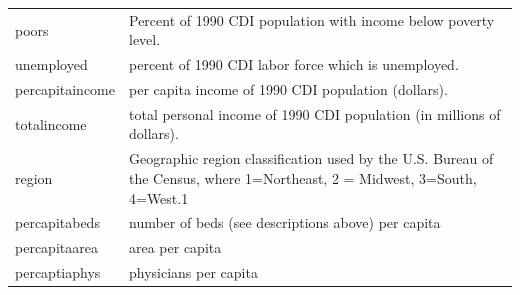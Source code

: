\documentclass[]{article}
\begin{document}
\begin{longtable}[]{@{}ll@{}}
\begin{minipage}[t]{0.11\columnwidth}
poors\strut
\end{minipage} & \begin{minipage}[t]{0.84\columnwidth}\raggedright\strut
Percent of 1990 CDI population with income below poverty level.\strut
\end{minipage}\tabularnewline
\begin{minipage}[t]{0.11\columnwidth}\raggedright\strut
unemployed\strut
\end{minipage} & \begin{minipage}[t]{0.84\columnwidth}\raggedright\strut
percent of 1990 CDI labor force which is unemployed.\strut
\end{minipage}\tabularnewline
\begin{minipage}[t]{0.11\columnwidth}\raggedright\strut
percapitaincome\strut
\end{minipage} & \begin{minipage}[t]{0.84\columnwidth}\raggedright\strut
per capita income of 1990 CDI population (dollars).\strut
\end{minipage}\tabularnewline
\begin{minipage}[t]{0.11\columnwidth}\raggedright\strut
totalincome\strut
\end{minipage} & \begin{minipage}[t]{0.84\columnwidth}\raggedright\strut
total personal income of 1990 CDI population (in millions of
dollars).\strut
\end{minipage}\tabularnewline
\begin{minipage}[t]{0.11\columnwidth}\raggedright\strut
region\strut
\end{minipage} & \begin{minipage}[t]{0.84\columnwidth}\raggedright\strut
Geographic region classification used by the U.S. Bureau of the Census,
where 1=Northeast, 2 = Midwest, 3=South, 4=West.1\strut
\end{minipage}\tabularnewline
\begin{minipage}[t]{0.17\columnwidth}\raggedright\strut
percapitabeds\strut
\end{minipage} & \begin{minipage}[t]{0.84\columnwidth}\raggedright\strut
number of beds (see descriptions above) per capita\strut
\end{minipage}\tabularnewline
\begin{minipage}[t]{0.17\columnwidth}\raggedright\strut
percapitaarea\strut
\end{minipage} & \begin{minipage}[t]{0.84\columnwidth}\raggedright\strut
area per capita\strut
\end{minipage}\tabularnewline
\begin{minipage}[t]{0.17\columnwidth}\raggedright\strut
percaptiaphys\strut
\end{minipage} & \begin{minipage}[t]{0.84\columnwidth}\raggedright\strut
physicians per capita\strut
\end{minipage}\tabularnewline
\bottomrule
\end{longtable}
\end{document}
